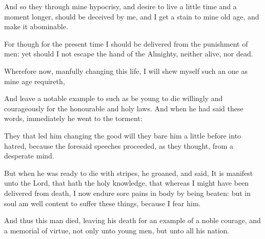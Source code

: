 {\par }{\PP {}And so they through mine hypocrisy, and desire to live a little time and a moment longer, should be deceived by me, and I get a stain to mine old age, and make it abominable.
\par }{\PP {}For though for the present time I should be delivered from the punishment of men: yet should I not escape the hand of the Almighty, neither alive, nor dead.
\par }{\PP {}Wherefore now, manfully changing this life, I will shew myself such an one as mine age requireth,
\par }{\PP {}And leave a notable example to such as be young to die willingly and courageously for the honourable and holy laws. And when he had said these words, immediately he went to the torment:
\par }{\PP {}They that led him changing the good will they bare him a little before into hatred, because the foresaid speeches proceeded, as they thought, from a desperate mind.
\par }{\PP {}But when he was ready to die with stripes, he groaned, and said, It is manifest unto the Lord, that hath the holy knowledge, that whereas I might have been delivered from death, I now endure sore pains in body by being beaten: but in soul am well content to suffer these things, because I fear him.
\par }{\PP {}And thus this man died, leaving his death for an example of a noble courage, and a memorial of virtue, not only unto young men, but unto all his nation.

}
